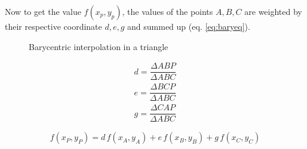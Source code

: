\documentclass[11pt,twoside,a4paper,fleqn,x11names]{report}
\numberwithin{equation}{chapter}
\numberwithin{figure}{chapter}
\numberwithin{table}{chapter}
\begin{document}
Now to get the value $f(x_p,y_p)$, the values of the points $A,B,C$ are weighted by their respective coordinate $d,e,g$ and summed up (eq. \ref{eq:baryeq}).
\begin{figure}
	\centering
	\caption{Barycentric interpolation in a triangle}
	\label{fig:bary}
\end{figure}


\begin{equation}
	\begin{aligned}
		d = \dfrac{\Delta ABP}{\Delta ABC}\\
		e = \dfrac{\Delta BCP}{\Delta ABC}\\
		g = \dfrac{\Delta CAP}{\Delta ABC}
	\end{aligned}
	\label{eq:barycor}
\end{equation}

\begin{equation}
f(x_P,y_P) = d\,f(x_A,y_A)+e\,f(x_B,y_B)+g\,f(x_C,y_C)
\label{eq:baryeq}
\end{equation}
\end{document}
